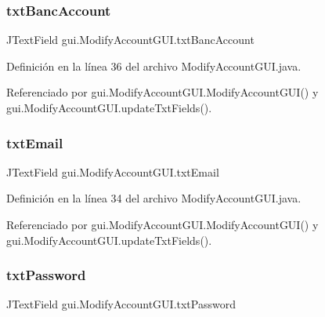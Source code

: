 \mbox{\label{classgui_1_1_modify_account_g_u_i_a4ae8a0fdffbec7405e1baf27e485f768}} 
\subsubsection{\texorpdfstring{txtBancAccount}{txtBancAccount}}
{\footnotesize\ttfamily J\+Text\+Field gui.\+Modify\+Account\+G\+U\+I.\+txt\+Banc\+Account\hspace{0.3cm}{\ttfamily [private]}}



Definición en la línea 36 del archivo Modify\+Account\+G\+U\+I.\+java.



Referenciado por gui.\+Modify\+Account\+G\+U\+I.\+Modify\+Account\+G\+U\+I() y gui.\+Modify\+Account\+G\+U\+I.\+update\+Txt\+Fields().

\mbox{\label{classgui_1_1_modify_account_g_u_i_a52839f2a7edd45f9c756f0012e4dc1d6}} 
\subsubsection{\texorpdfstring{txtEmail}{txtEmail}}
{\footnotesize\ttfamily J\+Text\+Field gui.\+Modify\+Account\+G\+U\+I.\+txt\+Email\hspace{0.3cm}{\ttfamily [private]}}



Definición en la línea 34 del archivo Modify\+Account\+G\+U\+I.\+java.



Referenciado por gui.\+Modify\+Account\+G\+U\+I.\+Modify\+Account\+G\+U\+I() y gui.\+Modify\+Account\+G\+U\+I.\+update\+Txt\+Fields().

\mbox{\label{classgui_1_1_modify_account_g_u_i_a589fabddc834cc42a2acaa2ad904ae3f}} 
\subsubsection{\texorpdfstring{txtPassword}{txtPassword}}
{\footnotesize\ttfamily J\+Text\+Field gui.\+Modify\+Account\+G\+U\+I.\+txt\+Password\hspace{0.3cm}{\ttfamily [private]}}



